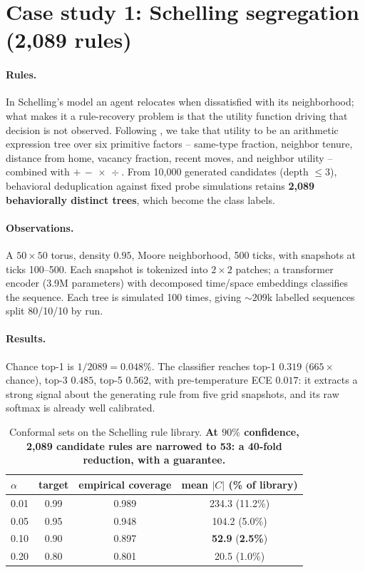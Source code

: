 \documentclass[11pt]{article}
\begin{document}
\section{Case study 1: Schelling segregation (2,089 rules)}
\label{sec:schelling}

\paragraph{Rules.}
In Schelling's model \citep{schelling1971} an agent relocates when dissatisfied with
its neighborhood; what makes it a rule-recovery problem is that the utility function
driving that decision is not observed. Following \citet{gunaratne2023}, we take that
utility to be an arithmetic expression tree over six primitive factors -- same-type fraction, neighbor tenure,
distance from home, vacancy fraction, recent moves, and neighbor utility -- combined
with $+\,-\,\times\,\div$. From 10,000 generated candidates (depth $\le 3$),
behavioral deduplication against fixed probe simulations retains \textbf{2,089
behaviorally distinct trees}, which become the class labels.

\paragraph{Observations.}
A $50\times50$ torus, density $0.95$, Moore neighborhood, 500 ticks, with snapshots
at ticks 100--500. Each snapshot is tokenized into $2\times2$ patches; a transformer
encoder (3.9M parameters) with decomposed time/space embeddings classifies the
sequence. Each tree is simulated 100 times, giving ${\sim}209$k labelled sequences
split 80/10/10 by run.

\paragraph{Results.}
Chance top-1 is $1/2089 = 0.048\%$. The classifier reaches top-1 $0.319$ ($665\times$
chance), top-3 $0.485$, top-5 $0.562$, with pre-temperature ECE $0.017$: it extracts
a strong signal about the generating rule from five grid snapshots, and its raw
softmax is already well calibrated.

\begin{table}[t]
\centering
\small
\caption{Conformal sets on the Schelling rule library. \textbf{At $90\%$ confidence,
2,089 candidate rules are narrowed to 53: a 40-fold reduction, with a guarantee.}}
\label{tab:schelling-conformal}
\begin{tabular}{lccc}
\toprule
$\alpha$ & target & empirical coverage & mean $|C|$ (\% of library) \\
\midrule
0.01 & 0.99 & 0.989 & 234.3 \; (11.2\%) \\
0.05 & 0.95 & 0.948 & 104.2 \; (5.0\%) \\
0.10 & 0.90 & 0.897 & \textbf{52.9} \; (\textbf{2.5\%}) \\
0.20 & 0.80 & 0.801 & 20.5 \; (1.0\%) \\
\bottomrule
\end{tabular}
\end{table}
\end{document}
